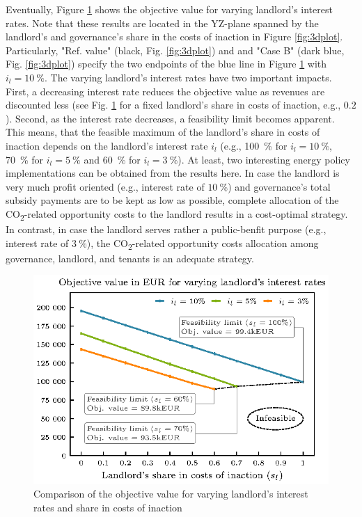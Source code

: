 Eventually, Figure \ref{fig:feasible} shows the objective value for varying landlord's interest rates. Note that these results are located in the YZ-plane spanned by the landlord's and governance's share in the costs of inaction in Figure \ref{fig:3dplot}. Particularly, "Ref. value" (black, Fig. \ref{fig:3dplot}) and and "Case B" (dark blue, Fig. \ref{fig:3dplot}) specify the two endpoints of the blue line in Figure \ref{fig:feasible} with $i_l=\SI{10}{\%}$. The varying landlord's interest rates have two important impacts. First, a decreasing interest rate reduces the objective value as revenues are discounted less (see Fig. \ref{fig:feasible} for a fixed landlord's share in costs of inaction, e.g., $0.2$). Second, as the interest rate decreases, a feasibility limit becomes apparent. This means, that the feasible maximum of the landlord's share in costs of inaction depends on the landlord's interest rate $i_l$ (e.g., \SI{100}{\%} for $i_l=\SI{10}{\%}$, \SI{70}{\%} for $i_l=\SI{5}{\%}$ and \SI{60}{\%} for $i_l=\SI{3}{\%}$). At least, two interesting energy policy implementations can be obtained from the results here. In case the landlord is very much profit oriented (e.g., interest rate of $\SI{10}{\%}$) and governance's total subsidy payments are to be kept as low as possible, complete allocation of the CO\textsubscript{2}-related opportunity costs to the landlord results in a cost-optimal strategy. In contrast, in case the landlord serves rather a public-benfit purpose (e.g., interest rate of $\SI{3}{\%}$), the CO\textsubscript{2}-related opportunity costs allocation among governance, landlord, and tenants is an adequate strategy.

\begin{figure}[h]
	\centering
	\includegraphics[width=0.65\linewidth]{figures/4_Results/fig_feasible/feasible.eps}
	\caption{Comparison of the objective value for varying landlord's interest rates and share in costs of inaction}
	\label{fig:feasible}
\end{figure}
